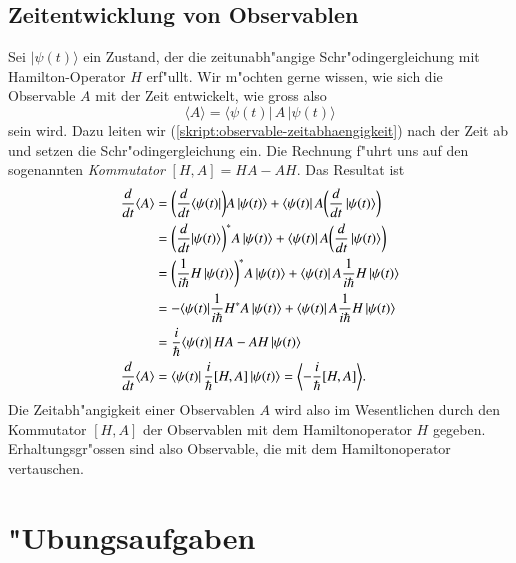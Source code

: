 %
%
\subsection{Zeitentwicklung von Observablen\label{section:zeitentwicklung-von-observablen}}
Sei $|\psi(t)\rangle$ ein Zustand, der die zeitunabh"angige
Schr"odingergleichung mit Hamilton-Operator $H$ erf"ullt. Wir m"ochten
gerne wissen, wie sich die Observable $A$ mit der Zeit entwickelt,
wie gross also
\begin{equation}
\langle A\rangle
=
\langle \psi(t)|\,A\,|\psi(t)\rangle
\label{skript:observable-zeitabhaengigkeit}
\end{equation}
sein wird. Dazu leiten wir (\ref{skript:observable-zeitabhaengigkeit}) nach der
Zeit ab und setzen die Schr"odingergleichung ein.
Die Rechnung f"uhrt uns auf den sogenannten {\em Kommutator} 
$[H,A]=HA-AH$.
%
Das Resultat ist
\begin{align}
\frac{d}{dt}\langle A\rangle
&=
\biggl(\frac{d}{dt}\langle\psi(t)|\biggr)A\,|\psi(t)\rangle
+
\langle\psi(t)|\,A\biggl(\frac{d}{dt}\,|\psi(t)\rangle\biggr)
\notag
\\
&=
\biggl(\frac{d}{dt}|\psi(t)\rangle\biggr)^*A\,|\psi(t)\rangle
+
\langle\psi(t)|\,A\biggl(\frac{d}{dt}\,|\psi(t)\rangle\biggr)
\notag
\\
&=
\biggl(\frac{1}{i\hbar}H\,|\psi(t)\rangle\biggr)^*A\,|\psi(t)\rangle
+
\langle\psi(t)|\,A\frac{1}{i\hbar}H\,|\psi(t)\rangle
\notag
\\
&=
-\langle \psi(t)| {\frac{1}{i\hbar}}H^*A\,|\psi(t)\rangle
+
\langle\psi(t)|\,A\frac{1}{i\hbar}H\,|\psi(t)\rangle
\notag
\\
&=
\frac{i}{\hbar}
\langle\psi(t)|\, HA-AH \,|\psi(t)\rangle
\notag
\\
\frac{d}{dt}\langle A\rangle
&=\langle\psi(t)|\, \frac{i}{\hbar}[H,A] \,|\psi(t)\rangle
=\biggl\langle
-\frac{i}{\hbar}[H,A]
\biggr\rangle.
\label{skript:observableZeitentwicklung}
\end{align}
Die Zeitabh"angigkeit einer Observablen $A$ wird also im Wesentlichen
durch den Kommutator $[H,A]$ der Observablen mit dem Hamiltonoperator $H$
gegeben. Erhaltungsgr"ossen sind also Observable, die mit dem
Hamiltonoperator vertauschen.

\section*{"Ubungsaufgaben}
\begin{uebungsaufgaben}
\item

\item

\item

\item

\end{uebungsaufgaben}

